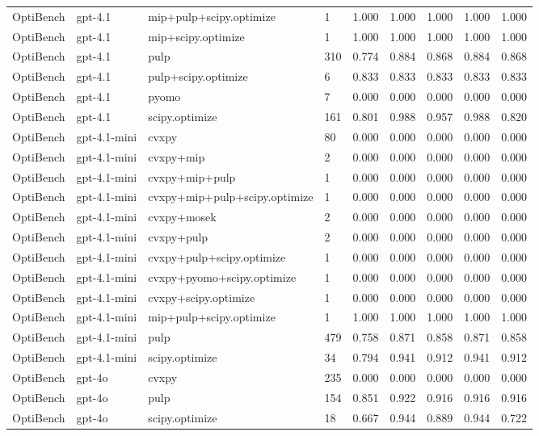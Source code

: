 \begin{table}[t]
\begin{tabular}{lllllllll}
OptiBench & gpt-4.1 & mip+pulp+scipy.optimize & 1 & 1.000 & 1.000 & 1.000 & 1.000 & 1.000 \\
OptiBench & gpt-4.1 & mip+scipy.optimize & 1 & 1.000 & 1.000 & 1.000 & 1.000 & 1.000 \\
OptiBench & gpt-4.1 & pulp & 310 & 0.774 & 0.884 & 0.868 & 0.884 & 0.868 \\
OptiBench & gpt-4.1 & pulp+scipy.optimize & 6 & 0.833 & 0.833 & 0.833 & 0.833 & 0.833 \\
OptiBench & gpt-4.1 & pyomo & 7 & 0.000 & 0.000 & 0.000 & 0.000 & 0.000 \\
OptiBench & gpt-4.1 & scipy.optimize & 161 & 0.801 & 0.988 & 0.957 & 0.988 & 0.820 \\
OptiBench & gpt-4.1-mini & cvxpy & 80 & 0.000 & 0.000 & 0.000 & 0.000 & 0.000 \\
OptiBench & gpt-4.1-mini & cvxpy+mip & 2 & 0.000 & 0.000 & 0.000 & 0.000 & 0.000 \\
OptiBench & gpt-4.1-mini & cvxpy+mip+pulp & 1 & 0.000 & 0.000 & 0.000 & 0.000 & 0.000 \\
OptiBench & gpt-4.1-mini & cvxpy+mip+pulp+scipy.optimize & 1 & 0.000 & 0.000 & 0.000 & 0.000 & 0.000 \\
OptiBench & gpt-4.1-mini & cvxpy+mosek & 2 & 0.000 & 0.000 & 0.000 & 0.000 & 0.000 \\
OptiBench & gpt-4.1-mini & cvxpy+pulp & 2 & 0.000 & 0.000 & 0.000 & 0.000 & 0.000 \\
OptiBench & gpt-4.1-mini & cvxpy+pulp+scipy.optimize & 1 & 0.000 & 0.000 & 0.000 & 0.000 & 0.000 \\
OptiBench & gpt-4.1-mini & cvxpy+pyomo+scipy.optimize & 1 & 0.000 & 0.000 & 0.000 & 0.000 & 0.000 \\
OptiBench & gpt-4.1-mini & cvxpy+scipy.optimize & 1 & 0.000 & 0.000 & 0.000 & 0.000 & 0.000 \\
OptiBench & gpt-4.1-mini & mip+pulp+scipy.optimize & 1 & 1.000 & 1.000 & 1.000 & 1.000 & 1.000 \\
OptiBench & gpt-4.1-mini & pulp & 479 & 0.758 & 0.871 & 0.858 & 0.871 & 0.858 \\
OptiBench & gpt-4.1-mini & scipy.optimize & 34 & 0.794 & 0.941 & 0.912 & 0.941 & 0.912 \\
OptiBench & gpt-4o & cvxpy & 235 & 0.000 & 0.000 & 0.000 & 0.000 & 0.000 \\
OptiBench & gpt-4o & pulp & 154 & 0.851 & 0.922 & 0.916 & 0.916 & 0.916 \\
OptiBench & gpt-4o & scipy.optimize & 18 & 0.667 & 0.944 & 0.889 & 0.944 & 0.722 \\

\end{tabular}
\end{table}
